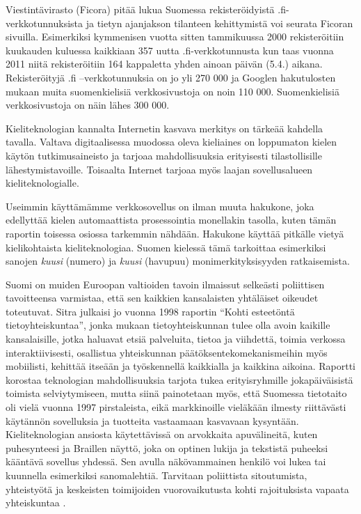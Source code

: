 \documentclass[]{../../metanetpaper}
\begin{document}
\begin{multicols}{2}
Viestintävirasto (Ficora) pitää lukua Suomessa rekisteröidyistä
.fi-verkkotunnuksista ja tietyn ajanjakson tilanteen kehittymistä voi
seurata Ficoran sivuilla. Esimerkiksi kymmenisen vuotta sitten
tammikuussa 2000 rekisteröitiin kuukauden kuluessa kaikkiaan 357 uutta
.fi-verkkotunnusta kun taas vuonna 2011 niitä rekisteröitiin 164
kappaletta yhden ainoan päivän (5.4.)  aikana. Rekisteröityjä .fi
–verkkotunnuksia on jo yli 270 000 ja Googlen hakutulosten mukaan
muita suomenkielisiä verkkosivustoja on noin 110 000.  Suomenkielisiä
verkkosivustoja on näin lähes 300 000.

Kieliteknologian kannalta Internetin kasvava merkitys on tärkeää
kahdella tavalla. Valtava digitaalisessa muodossa oleva kieliaines
on loppumaton kielen käytön tutkimusaineisto ja tarjoaa mahdollisuuksia erityisesti 
tilastollisille  lähestymistavoille. Toisaalta Internet tarjoaa myös 
laajan sovellusalueen kieliteknologialle.

Useimmin käyttämämme verkkosovellus on ilman muuta hakukone, joka
edellyttää kielen automaattista prosessointia monellakin tasolla,
kuten tämän raportin toisessa osiossa tarkemmin nähdään. Hakukone käyttää
pitkälle vietyä kielikohtaista kieliteknologiaa. Suomen kielessä tämä tarkoittaa 
esimerkiksi  sanojen \textit{kuusi} (numero)
ja \textit{kuusi} (havupuu) monimerkityksisyyden ratkaisemista.

Suomi on muiden Euroopan valtioiden tavoin ilmaissut selkeästi
poliittisen tavoitteensa varmistaa, että sen kaikkien kansalaisten yhtäläiset
oikeudet toteutuvat. Sitra julkaisi jo vuonna 1998 raportin “Kohti
esteetöntä tietoyhteiskuntaa”, jonka mukaan tietoyhteiskunnan
tulee olla avoin kaikille kansalaisille, jotka haluavat 
etsiä palveluita, tietoa ja viihdettä, toimia verkossa
interaktiivisesti, osallistua yhteiskunnan päätöksentekomekanismeihin
myös mobiilisti, kehittää itseään ja työskennellä kaikkialla ja
kaikkina aikoina. Raportti korostaa teknologian mahdollisuuksia
tarjota tukea erityisryhmille jokapäiväisistä toimista selviytymiseen,
mutta siinä painotetaan myös, että Suomessa tietotaito oli vielä
vuonna 1997 pirstaleista, eikä markkinoille vieläkään ilmesty riittävästi käytännön
sovelluksia ja tuotteita vastaamaan kasvavaan kysyntään. Kieliteknologian ansiosta
käytettävissä on arvokkaita apuvälineitä, kuten puhesynteesi ja Braillen
näyttö, joka on optinen lukija ja tekstistä puheeksi kääntävä sovellus yhdessä. 
Sen avulla näkövammainen henkilö voi lukea tai kuunnella esimerkiksi sanomalehtiä. 
Tarvitaan poliittista sitoutumista, yhteistyötä ja keskeisten toimijoiden 
vuorovaikutusta  kohti rajoituksista vapaata yhteiskuntaa \cite{Sitra1998}.


\end{multicols}
\end{document}
